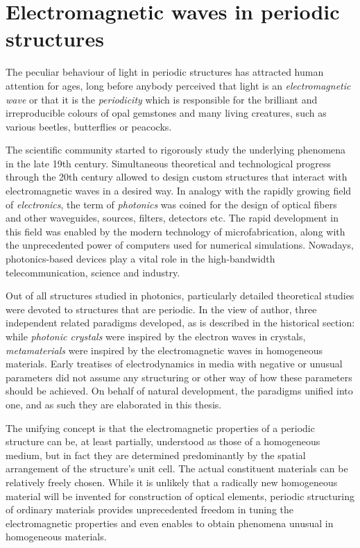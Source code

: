 
\section{Electromagnetic waves in periodic structures} %
The peculiar behaviour of light in periodic structures has attracted human attention for ages, long before anybody perceived that light is an \textit{electromagnetic wave} or that it is the \textit{periodicity} which is responsible for the brilliant and irreproducible colours of opal gemstones and many living creatures, such as various beetles, butterflies or peacocks. 

The scientific community started to rigorously study the underlying phenomena in the late 19th century.
Simultaneous theoretical and technological progress through the 20th century allowed to design custom structures that interact with electromagnetic waves in a desired way. In analogy with the rapidly growing field of \textit{electronics}, the term of \textit{photonics} was coined for the design of optical fibers and other waveguides, sources, filters, detectors etc. The rapid development in this field was enabled by the modern technology of microfabrication, along with the unprecedented power of computers used for numerical simulations. Nowadays, photonics-based devices play a vital role in the high-bandwidth telecommunication, science and industry.

Out of all structures studied in photonics, particularly detailed theoretical studies were devoted to structures that are periodic. %
In the view of author, three independent related paradigms developed, as is described in the historical section: while \textit{photonic crystals} were inspired by the electron waves in crystals, \textit{metamaterials} were inspired by the electromagnetic waves in homogeneous materials. Early treatises of electrodynamics in media with negative or unusual parameters did not assume any structuring or other way of how these parameters should be achieved. On behalf of natural development, the paradigms unified into one, and as such they are elaborated in this thesis. 

The unifying concept is that the electromagnetic properties of a periodic structure can be, at least partially, understood as those of a homogeneous medium, but in fact they are determined predominantly by the spatial arrangement of the structure's unit cell. The actual constituent materials can be relatively freely chosen. %
While it is unlikely that a radically new homogeneous material will be invented for construction of optical elements, periodic structuring of ordinary materials provides unprecedented freedom in tuning the electromagnetic properties and even enables to obtain phenomena unusual in homogeneous materials. 

